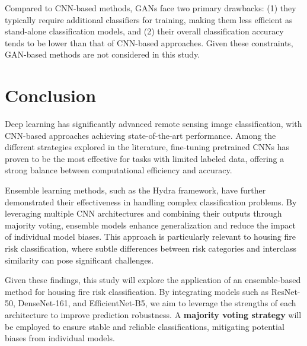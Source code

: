 Compared to CNN-based methods, GANs face two primary drawbacks: (1) they typically require additional classifiers 
for training, making them less efficient as stand-alone classification models, and (2) their overall classification 
accuracy tends to be lower than that of CNN-based approaches. Given these constraints, GAN-based methods are not 
considered in this study.

\section{Conclusion}

Deep learning has significantly advanced remote sensing image classification, with CNN-based 
approaches achieving state-of-the-art performance. Among the different strategies explored 
in the literature, fine-tuning pretrained CNNs has proven to be the most effective for tasks 
with limited labeled data, offering a strong balance between computational efficiency and accuracy.

Ensemble learning methods, such as the Hydra framework, have further demonstrated their 
effectiveness in handling complex classification problems. By leveraging multiple CNN 
architectures and combining their outputs through majority voting, ensemble models enhance 
generalization and reduce the impact of individual model biases. This approach is 
particularly relevant to housing fire risk classification, where subtle differences between 
risk categories and interclass similarity can pose significant challenges.

Given these findings, this study will explore the application of an ensemble-based 
method for housing fire risk classification. By integrating models such as ResNet-50, DenseNet-161, 
and EfficientNet-B5, we aim to leverage the strengths of each architecture to improve 
prediction robustness. A \textbf{majority voting strategy} will be employed to ensure stable 
and reliable classifications, mitigating potential biases from individual models. 
